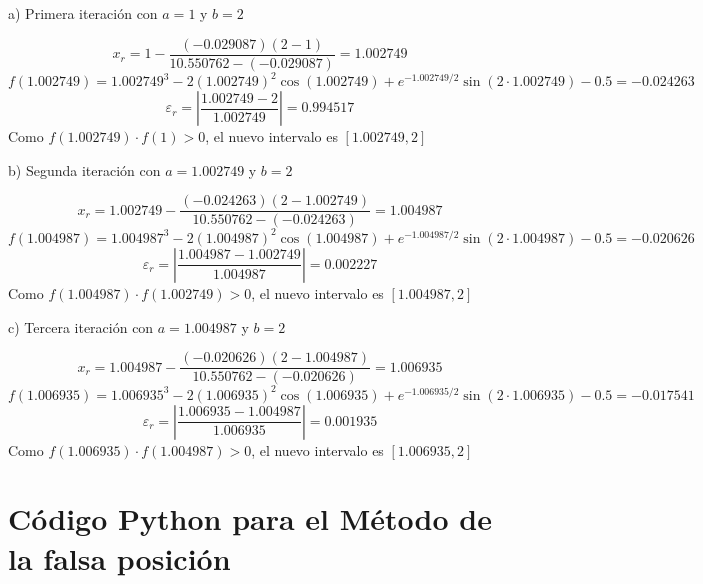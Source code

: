 \documentclass[12pt]{article}
\begin{document}
\begin{center}

\vspace{0.5cm}



a) Primera iteración con $a=1$ y $b=2$

\[ x_r=1 - \frac{(-0.029087)(2-1)}{10.550762-(-0.029087)}=1.002749 \]
\[ f(1.002749)=1.002749^3-2(1.002749)^2\cos(1.002749)+e^{-1.002749/2}\sin(2\cdot1.002749)-0.5=-0.024263 \]
\[ \varepsilon_r=\left|\frac{1.002749-2}{1.002749}\right|=0.994517 \]
Como $f(1.002749)\cdot f(1) > 0$, el nuevo intervalo es $[1.002749, 2]$

\vspace{0.5cm}

b) Segunda iteración con $a=1.002749$ y $b=2$

\[ x_r=1.002749 - \frac{(-0.024263)(2-1.002749)}{10.550762-(-0.024263)}=1.004987 \]
\[ f(1.004987)=1.004987^3-2(1.004987)^2\cos(1.004987)+e^{-1.004987/2}\sin(2\cdot1.004987)-0.5=-0.020626 \]
\[ \varepsilon_r=\left|\frac{1.004987-1.002749}{1.004987}\right|=0.002227 \]
Como $f(1.004987)\cdot f(1.002749) > 0$, el nuevo intervalo es $[1.004987, 2]$

\vspace{0.5cm}

c) Tercera iteración con $a=1.004987$ y $b=2$

\[ x_r=1.004987 - \frac{(-0.020626)(2-1.004987)}{10.550762-(-0.020626)}=1.006935 \]
\[ f(1.006935)=1.006935^3-2(1.006935)^2\cos(1.006935)+e^{-1.006935/2}\sin(2\cdot1.006935)-0.5=-0.017541 \]
\[ \varepsilon_r=\left|\frac{1.006935-1.004987}{1.006935}\right|=0.001935 \]
Como $f(1.006935)\cdot f(1.004987) > 0$, el nuevo intervalo es $[1.006935, 2]$
\vspace{1cm}

\section*{Código Python para el Método de la falsa posición}


\end{center}
\end{document}
